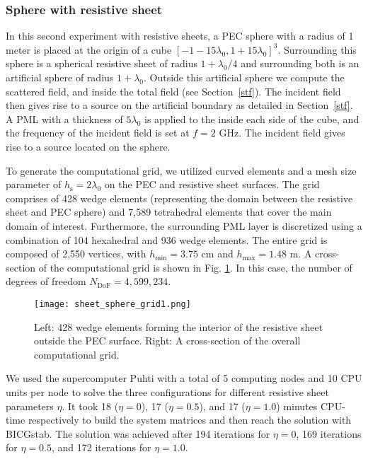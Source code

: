 \documentclass[a4paper,12pt]{article}
\newcommand{\hs}{h_{\mathrm{s}}}
\newcommand{\Ndof}{N_{\mathrm{DoF}}}
\begin{document}
\subsubsection{Sphere with resistive sheet}

In this second experiment with resistive sheets, a PEC sphere with a radius of 1 meter is placed at the origin of a cube $[-1-15\lambda_0, 1+15\lambda_0]^3$. Surrounding this sphere is a spherical resistive sheet of radius $1+\lambda_0/4$ and surrounding both is an artificial sphere of radius $1+\lambda_0$. Outside this artificial sphere we  compute the scattered field, and inside the total field (see Section~\ref{stf}). The incident field then gives rise to a source  on the artificial boundary as detailed in Section~\ref{stf}. A PML with a thickness of $5\lambda_0$ is applied to the inside each side of the cube, and the frequency of the incident field is set at $f = 2$ GHz. The incident field gives rise to a source located on the sphere.

To generate the computational grid, we utilized curved elements and a
mesh size parameter of $\hs=2\lambda_0$ on the PEC and resistive sheet
surfaces. The grid comprises of 428 wedge elements (representing the
domain between the resistive sheet and PEC sphere) and 7,589
tetrahedral elements that cover the main domain of
interest. Furthermore, the surrounding PML layer is discretized using
a combination of 104 hexahedral and 936 wedge elements. The entire
grid is composed of 2,550 vertices, with $h_{\min} = 3.75$ cm and
$h_{\max} = 1.48$ m. A cross-section of the computational grid is
shown in Fig. \ref{fig:sheet_sphere_grid}. In this case, the number of
degrees of freedom $\Ndof=4,599,234$.

\begin{figure}[!htb]
    \centering
    \texttt{[image: sheet\_sphere\_grid1.png]} 
\caption{Left: 428 wedge elements forming the interior of the resistive sheet outside the PEC surface. Right: A cross-section of the overall computational grid. }
    \label{fig:sheet_sphere_grid}
\end{figure}

We used the supercomputer Puhti with a total of 5 computing nodes and 10 CPU units per node to solve the three configurations for different resistive sheet parameters $\eta$. It took 18 ($\eta=0$), 17 ($\eta=0.5$), and 17 ($\eta=1.0$) minutes CPU-time respectively to build the 
system matrices and then reach the solution with BICGstab. The solution was achieved after 194 iterations for $\eta=0$, 169 iterations for $\eta=0.5$, and 172 iterations for $\eta=1.0$.
\end{document}
